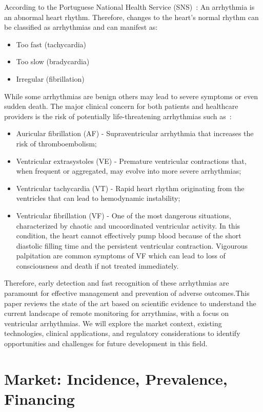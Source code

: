 \documentclass[conference]{IEEEtran}
\begin{document}
According to the Portuguese National Health Service
(SNS)~\cite{sns24_arrhythmias, cuf_arrhythmias}: An arrhythmia is an abnormal
heart rhythm. Therefore, changes to the heart's normal rhythm can be classified
as arrhythmias and can manifest as:
\begin{itemize}
    \item Too fast (tachycardia)
    \item Too slow (bradycardia)
    \item Irregular (fibrillation)
\end{itemize}
While some arrhythmias are benign others may lead to severe symptoms or even sudden death.
The major clinical concern for both patients and healthcare providers is the risk of
potentially life-threatening arrhythmias such as~\cite{ha_arrhythmias}:
\begin{itemize}
    \item Auricular fibrillation (AF) - Supraventricular arrhythmia that increases the
          risk of thromboembolism;
    \item Ventricular extrasystoles (VE) - Premature ventricular contractions that, when
          frequent or aggregated, may evolve into more severe arrhythmias;
    \item Ventricular tachycardia (VT) - Rapid heart rhythm originating from the
          ventricles that can lead to hemodynamic instability;
    \item Ventricular fibrillation (VF) - One of the most dangerous situations,
          characterized by chaotic and uncoordinated ventricular activity. In this
          condition, the heart cannot effectively pump blood because of the short
          diastolic filling time and the persistent ventricular contraction. Vigourous
          palpitation are common symptoms of VF which can lead to loss of consciousness
          and death if not treated immediately.
\end{itemize}
Therefore, early detection and fast recognition of these arrhythmias are paramount for effective management
and prevention of adverse outcomes.This paper reviews the state of the art based on scientific evidence to
understand the current landscape of remote monitoring for arrythmias, with a focus on ventricular
arrhythmias. We will explore the market context, existing technologies, clinical applications,
and regulatory considerations to identify opportunities and challenges for future development in this field.

\section{Market: Incidence, Prevalence, Financing}
\end{document}
